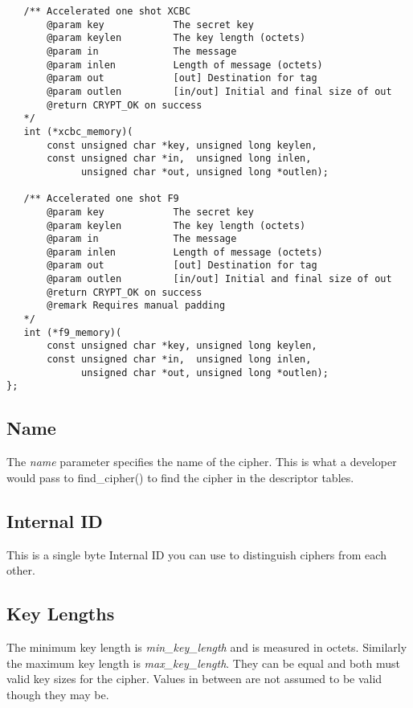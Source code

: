 \documentclass[synpaper]{book}
\begin{document}
\begin{small}
\begin{verbatim}
   /** Accelerated one shot XCBC 
       @param key            The secret key
       @param keylen         The key length (octets) 
       @param in             The message 
       @param inlen          Length of message (octets)
       @param out            [out] Destination for tag
       @param outlen         [in/out] Initial and final size of out
       @return CRYPT_OK on success
   */
   int (*xcbc_memory)(
       const unsigned char *key, unsigned long keylen,
       const unsigned char *in,  unsigned long inlen,
             unsigned char *out, unsigned long *outlen);

   /** Accelerated one shot F9 
       @param key            The secret key
       @param keylen         The key length (octets) 
       @param in             The message 
       @param inlen          Length of message (octets)
       @param out            [out] Destination for tag
       @param outlen         [in/out] Initial and final size of out
       @return CRYPT_OK on success
       @remark Requires manual padding
   */
   int (*f9_memory)(
       const unsigned char *key, unsigned long keylen,
       const unsigned char *in,  unsigned long inlen,
             unsigned char *out, unsigned long *outlen);
};
\end{verbatim}
\end{small}

\subsection{Name}
The \textit{name} parameter specifies the name of the cipher.  This is what a developer would pass to find\_cipher() to find the cipher in the descriptor
tables.

\subsection{Internal ID}
This is a single byte Internal ID you can use to distinguish ciphers from each other.

\subsection{Key Lengths}
The minimum key length is \textit{min\_key\_length} and is measured in octets.  Similarly the maximum key length is \textit{max\_key\_length}.  They can be equal
and both must valid key sizes for the cipher.  Values in between are not assumed to be valid though they may be.
\end{document}
